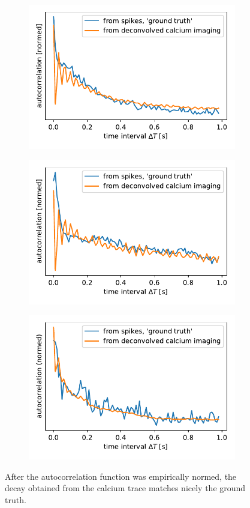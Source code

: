 \documentclass[12pt,a4paper,headinclude]{scrartcl}
\begin{document}
\begin{figure}
	\begin{subfigure}{.5\textwidth}
		\centering
		\includegraphics[width=1\linewidth]{./figures/comparison1_normed.pdf}
	\end{subfigure}%
	\begin{subfigure}{.5\textwidth}
		\centering
		\includegraphics[width=1\linewidth]{./figures/comparison2_normed.pdf}
	\end{subfigure}%
	
	\begin{subfigure}{1\textwidth}
		\centering
		\includegraphics[width=0.5\linewidth]{./figures/comparison3_normed.pdf}
	\end{subfigure}%
	\caption{After the autocorrelation function was empirically normed, the decay obtained from the calcium trace matches nicely the ground truth. }
	\label{fig:comparison_2p_normed}
\end{figure}
\end{document}
